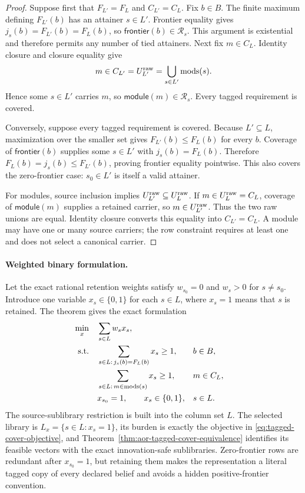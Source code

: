 \begin{proof}
Suppose first that \(F_{L'}=F_L\) and \(C_{L'}=C_L\).  Fix \(b\in B\).
The finite maximum defining \(F_{L'}(b)\) has an attainer
\(s\in L'\).  Frontier equality gives
\(j_s(b)=F_{L'}(b)=F_L(b)\), so
\(\mathsf{frontier}(b)\in\mathcal R_s\).  This argument is existential and
therefore permits any number of tied attainers.  Next fix \(m\in C_L\).
Identity closure and closure equality give
\[
 m\in C_{L'}=U_{L'}^{\rm raw}
   =\bigcup_{s\in L'}\operatorname{mods}(s).
\]
Hence some \(s\in L'\) carries \(m\), so
\(\mathsf{module}(m)\in\mathcal R_s\).  Every tagged requirement is covered.

Conversely, suppose every tagged requirement is covered.  Because
\(L'\subseteq L\), maximization over the smaller set gives
\(F_{L'}(b)\leq F_L(b)\) for every \(b\).  Coverage of
\(\mathsf{frontier}(b)\) supplies some \(s\in L'\) with
\(j_s(b)=F_L(b)\).  Therefore
\(F_L(b)=j_s(b)\leq F_{L'}(b)\), proving frontier equality pointwise.  This
also covers the zero-frontier case: \(s_0\in L'\) is itself a valid attainer.

For modules, source inclusion implies
\(U_{L'}^{\rm raw}\subseteq U_L^{\rm raw}\).  If
\(m\in U_L^{\rm raw}=C_L\), coverage of
\(\mathsf{module}(m)\) supplies a retained carrier, so
\(m\in U_{L'}^{\rm raw}\).  Thus the two raw unions are equal.  Identity
closure converts this equality into \(C_{L'}=C_L\).  A module may have one or
many source carriers; the row constraint requires at least one and does not
select a canonical carrier.
\end{proof}

\paragraph{Weighted binary formulation.}
Let the exact rational retention weights satisfy \(w_{s_0}=0\) and
\(w_s>0\) for \(s\neq s_0\).  Introduce one variable \(x_s\in\{0,1\}\) for
each \(s\in L\), where \(x_s=1\) means that \(s\) is retained.  The theorem
gives the exact formulation
\begin{align}
 \min_{x}\quad &\sum_{s\in L}w_sx_s,
     \label{eq:tagged-cover-objective}\\
 \text{s.t.}\quad
 &\sum_{s\in L:\,j_s(b)=F_L(b)}x_s\geq 1,
       && b\in B,\label{eq:tagged-frontier-rows}\\
 &\sum_{s\in L:\,m\in\operatorname{mods}(s)}x_s\geq 1,
       && m\in C_L,\label{eq:tagged-module-rows}\\
 &x_{s_0}=1,\qquad x_s\in\{0,1\},
       &&s\in L.\label{eq:tagged-binary-domain}
\end{align}
The source-sublibrary restriction is built into the column set \(L\).  The
selected library is \(L_x=\{s\in L:x_s=1\}\), its burden is exactly the
objective in \eqref{eq:tagged-cover-objective}, and
Theorem~\ref{thm:aor-tagged-cover-equivalence} identifies its feasible vectors
with the exact innovation-safe sublibraries.  Zero-frontier rows are
redundant after \(x_{s_0}=1\), but retaining them makes the representation a
literal tagged copy of every declared belief and avoids a hidden
positive-frontier convention.

